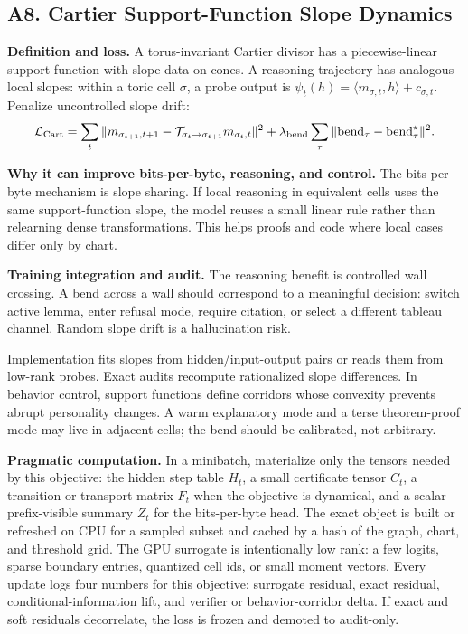 \documentclass[10pt]{article}
\newcommand{\loss}{\mathcal{L}}
\numberwithin{equation}{section}
\begin{document}
\subsection{A8. Cartier Support-Function Slope Dynamics}
\noindent\textbf{Definition and loss.} A torus-invariant Cartier divisor has a piecewise-linear support function with slope data on cones. A reasoning trajectory has analogous local slopes: within a toric cell $\sigma$, a probe output is $\psi_t(h)=\langle m_{\sigma,t},h\rangle+c_{\sigma,t}$. Penalize uncontrolled slope drift:
\[
\loss_{\rm Cart}=\sum_t\|m_{\sigma_{t+1},t+1}-\mathcal T_{\sigma_t\to\sigma_{t+1}}m_{\sigma_t,t}\|^2+\lambda_{\rm bend}\sum_{\tau}\|\mathrm{bend}_\tau-\mathrm{bend}_\tau^\star\|^2.
\]

\noindent\textbf{Why it can improve bits-per-byte, reasoning, and control.} The bits-per-byte mechanism is slope sharing. If local reasoning in equivalent cells uses the same support-function slope, the model reuses a small linear rule rather than relearning dense transformations. This helps proofs and code where local cases differ only by chart.

\noindent\textbf{Training integration and audit.} The reasoning benefit is controlled wall crossing. A bend across a wall should correspond to a meaningful decision: switch active lemma, enter refusal mode, require citation, or select a different tableau channel. Random slope drift is a hallucination risk.

Implementation fits slopes from hidden/input-output pairs or reads them from low-rank probes. Exact audits recompute rationalized slope differences. In behavior control, support functions define corridors whose convexity prevents abrupt personality changes. A warm explanatory mode and a terse theorem-proof mode may live in adjacent cells; the bend should be calibrated, not arbitrary.

\noindent\textbf{Pragmatic computation.} In a minibatch, materialize only the tensors needed by this objective: the hidden step table $H_t$, a small certificate tensor $C_t$, a transition or transport matrix $F_t$ when the objective is dynamical, and a scalar prefix-visible summary $Z_t$ for the bits-per-byte head. The exact object is built or refreshed on CPU for a sampled subset and cached by a hash of the graph, chart, and threshold grid. The GPU surrogate is intentionally low rank: a few logits, sparse boundary entries, quantized cell ids, or small moment vectors. Every update logs four numbers for this objective: surrogate residual, exact residual, conditional-information lift, and verifier or behavior-corridor delta. If exact and soft residuals decorrelate, the loss is frozen and demoted to audit-only.
\end{document}
